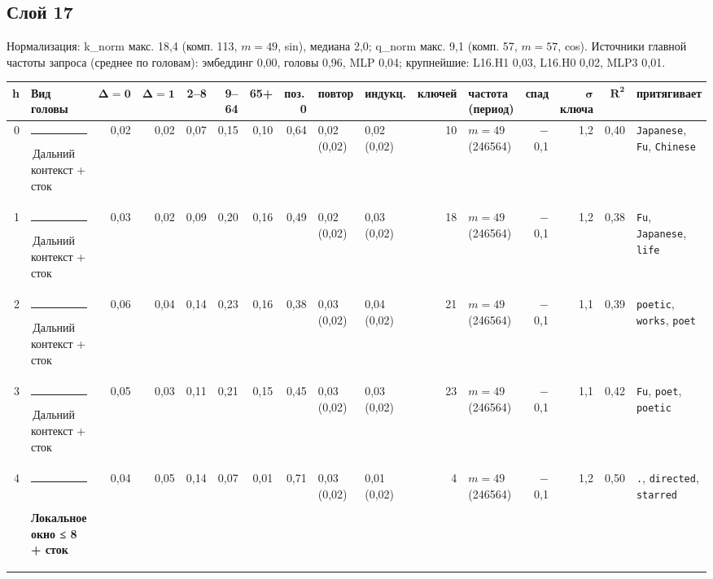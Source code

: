 \documentclass[10pt]{article}
\begin{document}
\noindent\begin{minipage}{\linewidth}
\subsection*{Слой 17}
{\small\color{ink2} Нормализация: k\_norm макс. 18,4 (комп. 113, $m{=}49$, sin), медиана 2,0; q\_norm макс. 9,1 (комп. 57, $m{=}57$, cos). Источники главной частоты запроса (среднее по головам): эмбеддинг 0,00, головы 0,96, MLP 0,04; крупнейшие: L16.H1 0,03, L16.H0 0,02, MLP3 0,01.}
\begin{center}{\footnotesize\begin{tabular}{|r|l|r|r|r|r|r|r|l|l|r|l|r|r|r|l|}
\hline
\rowcolor{head}\textbf{h} & \textbf{Вид головы} & $\boldsymbol{\Delta{=}0}$ & $\boldsymbol{\Delta{=}1}$ & \textbf{2–8} & \textbf{9–64} & \textbf{65+} & \textbf{поз.\,0} & \textbf{повтор} & \textbf{индукц.} & \textbf{ключей} & \textbf{частота (период)} & \textbf{спад} & $\boldsymbol{\sigma}$ \textbf{ключа} & $\boldsymbol{R^2}$ & \textbf{притягивает} \\ \hline
0 & \textcolor[HTML]{C3C2B7}{\rule{0.62em}{0.62em}}\,Дальний контекст + сток & 0,02 & 0,02 & 0,07 & 0,15 & 0,10 & 0,64 & 0,02 (0,02) & 0,02 (0,02) & 10 & $m{=}49$ (246564) & $-$0,1 & 1,2 & 0,40 & \texttt{\textvisiblespace{}Japanese}, \texttt{\textvisiblespace{}Fu}, \texttt{\textvisiblespace{}Chinese} \\ \hline
1 & \textcolor[HTML]{C3C2B7}{\rule{0.62em}{0.62em}}\,Дальний контекст + сток & 0,03 & 0,02 & 0,09 & 0,20 & 0,16 & 0,49 & 0,02 (0,02) & 0,03 (0,02) & 18 & $m{=}49$ (246564) & $-$0,1 & 1,2 & 0,38 & \texttt{\textvisiblespace{}Fu}, \texttt{\textvisiblespace{}Japanese}, \texttt{\textvisiblespace{}life} \\ \hline
2 & \textcolor[HTML]{C3C2B7}{\rule{0.62em}{0.62em}}\,Дальний контекст + сток & 0,06 & 0,04 & 0,14 & 0,23 & 0,16 & 0,38 & 0,03 (0,02) & 0,04 (0,02) & 21 & $m{=}49$ (246564) & $-$0,1 & 1,1 & 0,39 & \texttt{\textvisiblespace{}poetic}, \texttt{\textvisiblespace{}works}, \texttt{\textvisiblespace{}poet} \\ \hline
3 & \textcolor[HTML]{C3C2B7}{\rule{0.62em}{0.62em}}\,Дальний контекст + сток & 0,05 & 0,03 & 0,11 & 0,21 & 0,15 & 0,45 & 0,03 (0,02) & 0,03 (0,02) & 23 & $m{=}49$ (246564) & $-$0,1 & 1,1 & 0,42 & \texttt{\textvisiblespace{}Fu}, \texttt{\textvisiblespace{}poet}, \texttt{\textvisiblespace{}poetic} \\ \hline
4 & \textcolor[HTML]{1BAF7A}{\rule{0.62em}{0.62em}}\,\textbf{Локальное окно ≤ 8 + сток} & 0,04 & 0,05 & 0,14 & 0,07 & 0,01 & 0,71 & 0,03 (0,02) & 0,01 (0,02) & 4 & $m{=}49$ (246564) & $-$0,1 & 1,2 & 0,50 & \texttt{\textvisiblespace{}.}, \texttt{\textvisiblespace{}directed}, \texttt{\textvisiblespace{}starred} \\ \hline

\end{tabular}}
\end{center}
\end{minipage}
\end{document}
